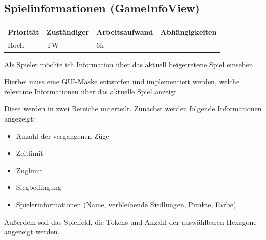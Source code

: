 \documentclass[a4paper]{scrreprt}
\newenvironment{requirement}[5] {
	\subsection{#1}
	\begin{tabularx}{\textwidth}{|X|l|X|X|}
		\hline
		Priorität & Zuständiger & Arbeitsaufwand & Abhängigkeiten \\
		\hline
		#2 & #3 & #4 & #5 \\
		\hline
	\end{tabularx}
	}{
	\newpage
	}
\begin{document}
\begin{requirement}{Spielinformationen (GameInfoView)}{Hoch}{TW}{6h}{-}

\begin{center}
	Als Spieler möchte ich Information über das aktuell beigetretene Spiel einsehen.
\end{center}

Hierbei muss eine GUI-Maske entworfen und implementiert werden, welche relevante Informationen über das aktuelle Spiel anzeigt.

Diese werden in zwei Bereiche unterteilt. Zunächst werden folgende Informationen angezeigt:
\begin{itemize}
	\item Anzahl der vergangenen Züge
	\item Zeitlimit
	\item Zuglimit
	\item Siegbedingung
	\item Spielerinformationen (Name, verbleibende Siedlungen, Punkte, Farbe)
\end{itemize}

Außerdem soll das Spielfeld, die Tokens und Anzahl der auswählbaren Hexagone angezeigt werden.

\end{requirement}
\end{document}
